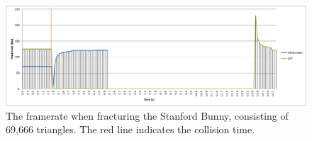 \FloatBarrier

\begin{figure}
\centerline{\includegraphics[scale=0.7]{../Logs/single_bunny_framerate.png}}
\caption{The framerate when fracturing the Stanford Bunny, consisting of 69,666 triangles. The red line indicates the collision time.}
\label{fig:4.22.1}
\end{figure}

